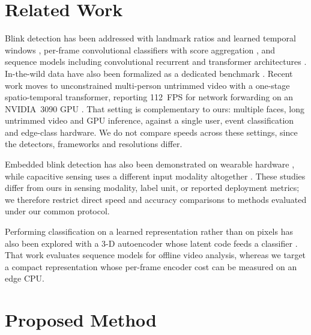 \documentclass{IEEE_lsens}
\begin{document}
\section{Related Work}

Blink detection has been addressed with landmark ratios and learned
temporal windows \cite{soukupova2016}, per-frame convolutional
classifiers with score aggregation \cite{daza2020}, and sequence models
including convolutional recurrent and transformer architectures
\cite{daza2024,fodor2023}. In-the-wild data have also been formalized
as a dedicated benchmark \cite{hu2019}. Recent work moves to unconstrained
multi-person untrimmed video with a one-stage spatio-temporal
transformer, reporting 112~FPS for network forwarding on an NVIDIA~3090
GPU \cite{zeng2023}. That setting is complementary to ours: multiple
faces, long untrimmed video and GPU inference, against a single user,
event classification and edge-class hardware. We do not compare speeds
across these settings, since the detectors, frameworks and resolutions
differ.

Embedded blink detection has also been demonstrated on wearable hardware
\cite{arcaya2021}, while capacitive sensing uses a different input
modality altogether \cite{capacitive2024}. These studies differ from
ours in sensing modality, label unit, or reported deployment metrics;
we therefore restrict direct speed and accuracy comparisons to methods
evaluated under our common protocol.

Performing classification on a learned representation rather than on
pixels has also been explored with a 3-D autoencoder whose latent code
feeds a classifier \cite{nousias2025}. That work evaluates sequence
models for offline video analysis, whereas we target a compact
representation whose per-frame encoder cost can be measured on an edge
CPU.

\section{Proposed Method}
\end{document}
